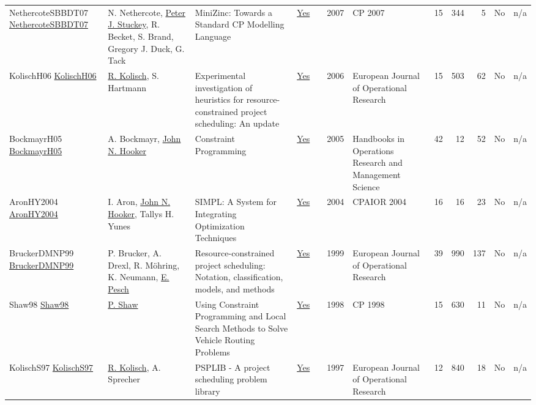 {\begin{longtable}{>{\raggedright\arraybackslash}p{3cm}>{\raggedright\arraybackslash}p{6cm}>{\raggedright\arraybackslash}p{6.5cm}rrrp{2.5cm}rrrrr}
NethercoteSBBDT07 \href{https://doi.org/10.1007/978-3-540-74970-7\_38}{NethercoteSBBDT07} & N. Nethercote, \hyperref[auth:a126]{Peter J. Stuckey}, R. Becket, S. Brand, Gregory J. Duck, G. Tack & MiniZinc: Towards a Standard {CP} Modelling Language & \href{../works/NethercoteSBBDT07.pdf}{Yes} & \cite{NethercoteSBBDT07} & 2007 & CP 2007 & 15 & 344 & 5 & No & n/a\\
KolischH06 \href{http://dx.doi.org/10.1016/j.ejor.2005.01.065}{KolischH06} & \hyperref[auth:a447]{R. Kolisch}, S. Hartmann & Experimental investigation of heuristics for resource-constrained project scheduling: An update & \href{../works/KolischH06.pdf}{Yes} & \cite{KolischH06} & 2006 & European Journal of Operational Research & 15 & 503 & 62 & No & n/a\\
BockmayrH05 \href{http://dx.doi.org/10.1016/s0927-0507(05)12010-6}{BockmayrH05} & A. Bockmayr, \hyperref[auth:a162]{John N. Hooker} & Constraint Programming & \href{../works/BockmayrH05.pdf}{Yes} & \cite{BockmayrH05} & 2005 & Handbooks in Operations Research and Management Science & 42 & 12 & 52 & No & n/a\\
AronHY2004 \href{http://dx.doi.org/10.1007/978-3-540-24664-0_2}{AronHY2004} & I. Aron, \hyperref[auth:a162]{John N. Hooker}, Tallys H. Yunes & SIMPL: A System for Integrating Optimization Techniques & \href{../works/AronHY2004.pdf}{Yes} & \cite{AronHY2004} & 2004 & CPAIOR 2004 & 16 & 16 & 23 & No & n/a\\
BruckerDMNP99 \href{http://dx.doi.org/10.1016/s0377-2217(98)00204-5}{BruckerDMNP99} & P. Brucker, A. Drexl, R. M\"{o}hring, K. Neumann, \hyperref[auth:a445]{E. Pesch} & Resource-constrained project scheduling: Notation,  classification,  models,  and methods & \href{../works/BruckerDMNP99.pdf}{Yes} & \cite{BruckerDMNP99} & 1999 & European Journal of Operational Research & 39 & 990 & 137 & No & n/a\\
Shaw98 \href{https://doi.org/10.1007/3-540-49481-2\_30}{Shaw98} & \hyperref[auth:a120]{P. Shaw} & Using Constraint Programming and Local Search Methods to Solve Vehicle Routing Problems & \href{../works/Shaw98.pdf}{Yes} & \cite{Shaw98} & 1998 & CP 1998 & 15 & 630 & 11 & No & n/a\\
KolischS97 \href{http://dx.doi.org/10.1016/s0377-2217(96)00170-1}{KolischS97} & \hyperref[auth:a447]{R. Kolisch}, A. Sprecher & PSPLIB - A project scheduling problem library & \href{../works/KolischS97.pdf}{Yes} & \cite{KolischS97} & 1997 & European Journal of Operational Research & 12 & 840 & 18 & No & n/a\\

\end{longtable}}
